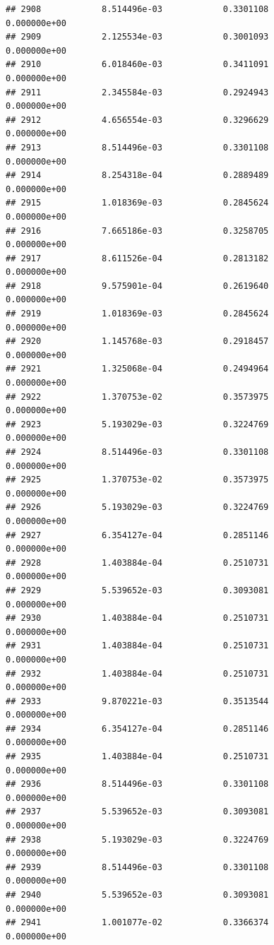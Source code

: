 \documentclass[
]{article}
\begin{document}
\begin{verbatim}
## 2908            8.514496e-03            0.3301108            0.000000e+00
## 2909            2.125534e-03            0.3001093            0.000000e+00
## 2910            6.018460e-03            0.3411091            0.000000e+00
## 2911            2.345584e-03            0.2924943            0.000000e+00
## 2912            4.656554e-03            0.3296629            0.000000e+00
## 2913            8.514496e-03            0.3301108            0.000000e+00
## 2914            8.254318e-04            0.2889489            0.000000e+00
## 2915            1.018369e-03            0.2845624            0.000000e+00
## 2916            7.665186e-03            0.3258705            0.000000e+00
## 2917            8.611526e-04            0.2813182            0.000000e+00
## 2918            9.575901e-04            0.2619640            0.000000e+00
## 2919            1.018369e-03            0.2845624            0.000000e+00
## 2920            1.145768e-03            0.2918457            0.000000e+00
## 2921            1.325068e-04            0.2494964            0.000000e+00
## 2922            1.370753e-02            0.3573975            0.000000e+00
## 2923            5.193029e-03            0.3224769            0.000000e+00
## 2924            8.514496e-03            0.3301108            0.000000e+00
## 2925            1.370753e-02            0.3573975            0.000000e+00
## 2926            5.193029e-03            0.3224769            0.000000e+00
## 2927            6.354127e-04            0.2851146            0.000000e+00
## 2928            1.403884e-04            0.2510731            0.000000e+00
## 2929            5.539652e-03            0.3093081            0.000000e+00
## 2930            1.403884e-04            0.2510731            0.000000e+00
## 2931            1.403884e-04            0.2510731            0.000000e+00
## 2932            1.403884e-04            0.2510731            0.000000e+00
## 2933            9.870221e-03            0.3513544            0.000000e+00
## 2934            6.354127e-04            0.2851146            0.000000e+00
## 2935            1.403884e-04            0.2510731            0.000000e+00
## 2936            8.514496e-03            0.3301108            0.000000e+00
## 2937            5.539652e-03            0.3093081            0.000000e+00
## 2938            5.193029e-03            0.3224769            0.000000e+00
## 2939            8.514496e-03            0.3301108            0.000000e+00
## 2940            5.539652e-03            0.3093081            0.000000e+00
## 2941            1.001077e-02            0.3366374            0.000000e+00

\end{verbatim}
\end{document}
